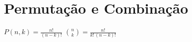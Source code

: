 \section{Permutação e Combinação}

{\centering
$\boxed{\displaystyle P(n, k) = \frac{n!}{(n-k)!}}$ \qquad $\boxed{\displaystyle \binom{n}{k} = \frac{n!}{k!\,(n-k)!}}$
\par}
